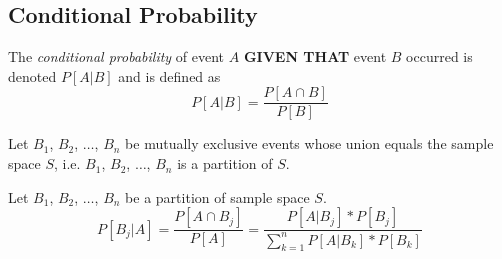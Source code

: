 	\subsection{Conditional Probability} \label{subsec:Conditional Probability}
		\begin{definition} \label{def:Conditional Probability}
			The \emph{conditional probability} of event $A$ \textbf{GIVEN THAT} event $B$ occurred is denoted $P \left[ A \vert B \right]$ and is defined as
			\begin{equation} \label{eq:Conditional Probability}
				P \left[ A \vert B \right] = \frac{P \left[ A \cap B \right]}{P \left[ B \right]}
			\end{equation}
		\end{definition}
		\begin{theorem} \label{thm:Theorem of Total Probability}
			Let $B_{1}$, $B_{2}$, $\ldots$, $B_{n}$ be mutually exclusive events whose union equals the sample space $S$, i.e. $B_{1}$, $B_{2}$, $\ldots$, $B_{n}$ is a partition of $S$.
		\end{theorem}
		\begin{definition} \label{def:Baye's Rule}
			Let $B_{1}$, $B_{2}$, $\ldots$, $B_{n}$ be a partition of sample space $S$.
			\begin{equation}
				P \left[ B_{j} \vert A \right] = \frac{P \left[ A \cap B_{j} \right]}{P \left[ A \right]}
				= \frac{P \left[ A \vert B_{j} \right] * P \left[ B_{j} \right]}{\sum\limits_{k=1}^{n} P \left[ A \vert B_{k} \right] * P \left[ B_{k} \right]}
			\end{equation}
		\end{definition}
